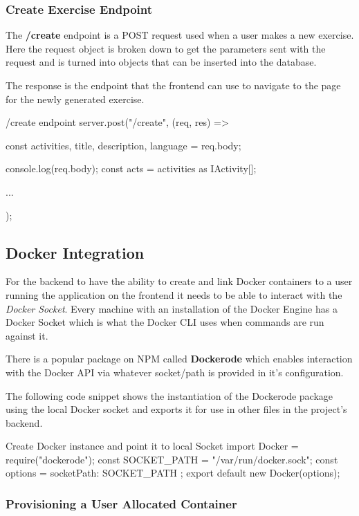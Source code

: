 \subsubsection{Create Exercise Endpoint}

The \textbf{/create} endpoint is a POST request used when a user makes a new exercise. Here the request object is broken down to get the parameters sent with the request and is turned into objects that can be inserted into the database.

The response is the endpoint that the frontend can use to navigate to the page for the newly generated exercise.

\begin{sexylisting}{/create endpoint}
server.post("/create", (req, res) => {
    const { activities, title, description, language } 
        = req.body;

    console.log(req.body);
    const acts = activities as IActivity[];
    
    {...}
});
\end{sexylisting}

\subsection{Docker Integration} \label{impl-docker}

For the backend to have the ability to create and link Docker containers to a user running the application on the frontend it needs to be able to interact with the \textit{Docker Socket}. Every machine with an installation of the Docker Engine has a Docker Socket which is what the Docker CLI uses when commands are run against it.

There is a popular package on NPM called \textbf{Dockerode} \cite{dockerode} which enables interaction with the Docker API via whatever socket/path is provided in it's configuration.

The following code snippet shows the instantiation of the Dockerode package using the local Docker socket and exports it for use in other files in the project's backend.

\begin{sexylisting}{Create Docker instance and point it to local Socket}    
import Docker = require("dockerode");
const SOCKET_PATH = "/var/run/docker.sock";
const options = { socketPath: SOCKET_PATH };
export default new Docker(options);
\end{sexylisting}

\subsubsection{Provisioning a User Allocated Container} \label{impl-alloc}

